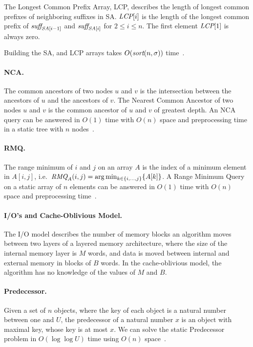 \documentclass[a4]{article}
\begin{document}
The Longest Common Prefix Array, LCP, describes the length of longest common prefixes of neighboring suffixes in SA. $\textit{LCP}[i]$ is the length of the longest common prefix of $\textit{suff}_{\textit{SA}[i-1]}$ and $\textit{suff}_{\textit{SA}[i]}$ for $2 \leq i \leq n$. The first element $\textit{LCP}[1]$ is always zero.

Building the SA, \SAi and LCP arrays takes $O(\textit{sort}(n,\sigma))$ time~\cite{sort-complexity}.

\paragraph{NCA.} The common ancestors of two nodes $u$ and $v$ is the intersection between the ancestors of $u$ and the ancestors of $v$. The Nearest Common Ancestor of two nodes $u$ and $v$ is the common ancestor of $u$ and $v$ of greatest depth. An NCA query can be answered in $O(1)$ time with $O(n)$ space and preprocessing time in a static tree with $n$ nodes~\cite{nca}.

\paragraph{RMQ.} The range minimum of $i$ and $j$ on an array $A$ is the index of a minimum element in $A[i,j]$, i.e.\ $\textit{RMQ}_A(i,j) = \arg \min_{k\in\{i,...,j\}}\{A[k]\}$. A Range Minimum Query on a static array of $n$ elements can be answered in $O(1)$ time with $O(n)$ space and preprocessing time~\cite{jf-rmq}.

\ifreport

\paragraph{I/O's and Cache-Oblivious Model.}
The I/O model describes the number of memory blocks an algorithm moves between two layers of a layered memory architecture, where the size of the internal memory layer is $M$ words, and data is moved between internal and external memory in blocks of $B$ words. In the cache-oblivious model, the algorithm has no knowledge of the values of $M$ and $B$.

\paragraph{Predecessor.}
Given a set of $n$ objects, where the key of each object is a natural number between one and $U$, the predecessor of a natural number $x$ is an object with maximal key, whose key is at most $x$. We can solve the static Predecessor problem in $O(\log\log U)$ time using $O(n)$ space~\cite{predecessor}.
\end{document}
